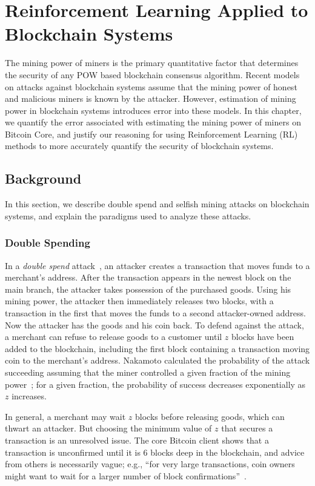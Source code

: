 \chapter{Reinforcement Learning Applied to Blockchain Systems}\label{selfishRL}
The mining power of miners is the primary quantitative factor that determines the security of any POW based blockchain consensus algorithm. Recent models~\cite{eyal:2014, sapirshtein:2015, Gervais:2016} on attacks against blockchain systems assume that the mining power of honest and malicious miners is known by the attacker. However, estimation of mining power in blockchain systems introduces error into these models. In this chapter, we quantify the error associated with estimating the mining power of miners on Bitcoin Core, and justify our reasoning for using Reinforcement Learning (RL) methods to more accurately quantify the security of blockchain systems.

\section{Background}
In this section, we describe double spend and selfish mining attacks on blockchain systems, and explain the paradigms used to analyze these attacks.

\subsection{Double Spending} 
In a {\em double spend} attack~\cite{Nakamoto:2009}, an attacker creates a transaction that moves
funds to a merchant's address. After the transaction appears in the
newest block on the main branch, the attacker takes possession of the purchased
goods. Using his mining power, the attacker then immediately releases
two blocks, with a transaction in the first that moves the funds to a
second attacker-owned address. Now the attacker has the goods and his
coin back. To defend against the attack, a merchant can refuse to
release goods to a customer until $z$ blocks have been
added to the blockchain, including the first block containing a
transaction moving coin to the merchant's address.  Nakamoto
calculated the probability of the attack succeeding assuming that the
miner controlled a given fraction of the mining power~\cite{Nakamoto:2009};
for a given fraction, the probability of success decreases exponentially as $z$
increases. 

In general, a merchant may wait $z$ blocks before releasing goods,
which can thwart an attacker.
But choosing the minimum value of $z$ that secures a transaction is an
unresolved issue. The core Bitcoin client shows that a transaction is
unconfirmed until it is 6 blocks deep in the
blockchain\cite{bitcoin:confirmation}, and advice from others is necessarily vague; e.g., ``for very large transactions, coin
owners might want to wait for a larger number of block
confirmations''~\cite{Bonneau:2015a}.   


